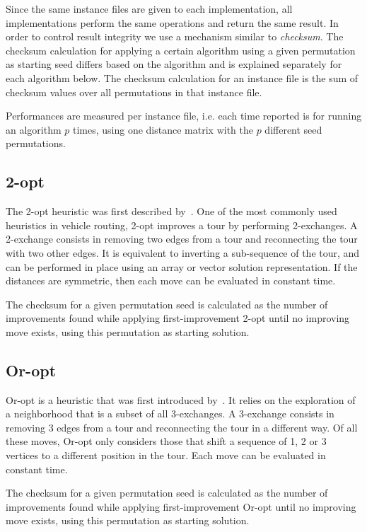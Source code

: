 \documentclass[11pt,a4paper,notitlepage]{article}
\begin{document}
Since the same
instance files are given to 
each implementation, all implementations perform the same operations
and return the same result. In order to control result integrity we use a
mechanism similar to \emph{checksum}. The checksum calculation for
applying a certain algorithm using a given permutation as starting seed differs
based on the algorithm and is explained separately for each algorithm
below. The checksum calculation for an instance file is the sum of
checksum values over all permutations in that instance file.

Performances are measured per instance file, i.e. each time reported
is for running an algorithm $p$ times, using one distance matrix with the $p$
different seed permutations.

\subsection{2-opt}
The 2-opt heuristic was first described by~\cite{2-opt}.
One of the most commonly used heuristics in vehicle routing, 2-opt
improves a tour by performing 2-exchanges. A 2-exchange consists in
removing two edges from a tour and reconnecting the tour with two
other edges. It is equivalent to inverting a sub-sequence of the
tour, and can be performed in place using an array or vector solution
representation. If the distances are symmetric, then each move can be
evaluated in constant time. 

The checksum for a given permutation seed is calculated as the number of
improvements found while applying first-improvement 2-opt until no
improving move exists, using this permutation as starting solution.

\subsection{Or-opt}
Or-opt is a heuristic that was first introduced by~\cite{Or-opt}.
It relies on the exploration of a neighborhood that is a subset of all
3-exchanges. A 3-exchange consists in removing 3 edges from a tour and
reconnecting the tour in a different way. Of all these moves, Or-opt
only considers those that shift a sequence of 1, 2 or 3 vertices to a
different position in the tour. Each move can be evaluated in constant time. 

The checksum for a given permutation seed is calculated as the number of
improvements found while applying first-improvement Or-opt until no
improving move exists, using this permutation as starting solution.
\end{document}
